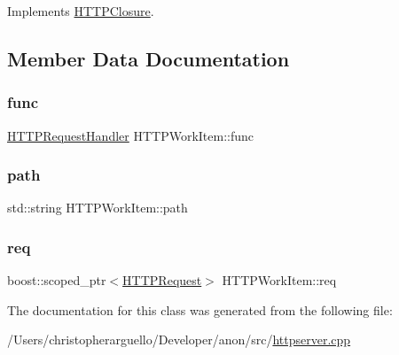 Implements \mbox{\hyperlink{class_h_t_t_p_closure_abbce5d429a7fe2b593919550e50bc225}{H\+T\+T\+P\+Closure}}.



\subsection{Member Data Documentation}
\mbox{\label{class_h_t_t_p_work_item_afe949b2467b4eb8197423f350bf7adaf}} 
\subsubsection{\texorpdfstring{func}{func}}
{\footnotesize\ttfamily \mbox{\hyperlink{httpserver_8h_a90b0a9a188f591e83851dad2b701088f}{H\+T\+T\+P\+Request\+Handler}} H\+T\+T\+P\+Work\+Item\+::func\hspace{0.3cm}{\ttfamily [private]}}

\mbox{\label{class_h_t_t_p_work_item_aad6cb131efdc3207e8338d87bbb26d27}} 
\subsubsection{\texorpdfstring{path}{path}}
{\footnotesize\ttfamily std\+::string H\+T\+T\+P\+Work\+Item\+::path\hspace{0.3cm}{\ttfamily [private]}}

\mbox{\label{class_h_t_t_p_work_item_adb8e8e5a46baf970c86761c8d52f8dc3}} 
\subsubsection{\texorpdfstring{req}{req}}
{\footnotesize\ttfamily boost\+::scoped\+\_\+ptr$<$\mbox{\hyperlink{class_h_t_t_p_request}{H\+T\+T\+P\+Request}}$>$ H\+T\+T\+P\+Work\+Item\+::req}



The documentation for this class was generated from the following file\+:\begin{DoxyCompactItemize}
\item 
/\+Users/christopherarguello/\+Developer/anon/src/\mbox{\hyperlink{httpserver_8cpp}{httpserver.\+cpp}}\end{DoxyCompactItemize}
